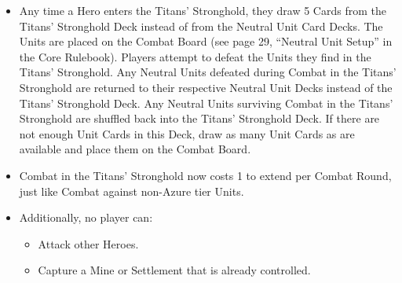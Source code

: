 \begin{multicols*}{2}
\begin{itemize}
  \item Any time a Hero enters the Titans' Stronghold, they draw 5 Cards from the Titans' Stronghold Deck instead of from the Neutral Unit Card Decks. The Units are placed on the Combat Board (see page 29, ``Neutral Unit Setup'' in the Core Rulebook). Players attempt to defeat the Units they find in the Titans' Stronghold. Any Neutral Units defeated during Combat in the Titans' Stronghold are returned to their respective Neutral Unit Decks instead of the Titans' Stronghold Deck. Any Neutral Units surviving Combat in the Titans' Stronghold are shuffled back into the Titans' Stronghold Deck. If there are not enough Unit Cards in this Deck, draw as many Unit Cards as are available and place them on the Combat Board.
  \item Combat in the Titans' Stronghold now costs 1  to extend per Combat Round, just like Combat against non-Azure tier Units.
  \item Additionally, no player can:
  \begin{itemize}
    \item Attack other Heroes.
    \item Capture a Mine or Settlement that is already controlled.
  \end{itemize}
\end{itemize}

\vspace*{\fill}

\begin{center}
\end{center}

\vspace*{\fill}

\end{multicols*}

\newpage

